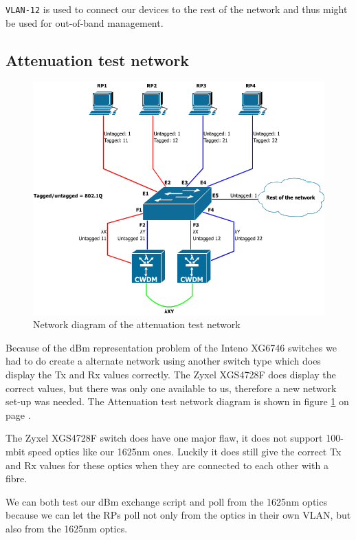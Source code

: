 \documentclass{article}
\begin{document}
\texttt{VLAN-12} is used to connect our devices to the rest of the network and thus might be used for out-of-band management.


\subsection{Attenuation test network}
\label{sec:attnet}

\begin{figure}[h]
\centerline{\includegraphics[scale=0.4, trim = 0mm 0mm 0mm 0mm]{images/CWDM.png}}
\caption{Network diagram of the attenuation test network}
\label{fig:CWDM}
\end{figure}

Because of the dBm representation problem of the Inteno XG6746 switches we had to do create a alternate network using another switch type which does display the Tx and Rx values correctly. The Zyxel XGS4728F does display the correct values, but there was only one available to us, therefore a new network set-up was needed. The Attenuation test network diagram is shown in figure \ref{fig:CWDM} on page \pageref{fig:CWDM}.

The Zyxel XGS4728F switch does have one major flaw, it does not support 100-mbit speed optics like our 1625nm ones. Luckily it does still give the correct Tx and Rx values for these optics when they are connected to each other with a fibre.

We can both test our dBm exchange script and poll from the 1625nm optics because we can let the RPs poll not only from the optics in their own VLAN, but also from the 1625nm optics.
\end{document}
